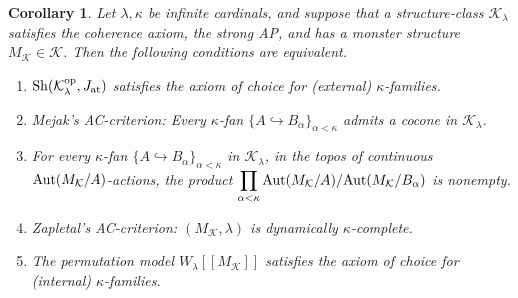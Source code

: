 \documentclass[10pt]{amsart}
\numberwithin{equation}{section}
\theoremstyle{plain}
\newtheorem{cor}[theorem]{Corollary}
\theoremstyle{definition}
\newcommand{\K}{\mathcal{K}}
\newcommand{\embed}{\hookrightarrow}
\begin{document}
\begin{cor}\label{cor:AC-criterion-main}
Let $\lambda,\kappa$ be infinite cardinals, and suppose that a structure-class $\K_\lambda$ satisfies the coherence axiom, the strong AP, and has a monster structure $M_\K\in\K$.
Then the following conditions are equivalent.
%
%
\begin{enumerate}
\item ${\rm Sh}(\K_\lambda^{\rm op},J_{\rm at})$ satisfies the axiom of choice for (external) $\kappa$-families.
\item Mejak's AC-criterion: Every $\kappa$-fan $\{A\embed B_\alpha\}_{\alpha<\kappa}$ admits a cocone in $\K_\lambda$. 
\item For every $\kappa$-fan $\{A\embed B_\alpha\}_{\alpha<\kappa}$ in $\K_\lambda$, in the topos of continuous ${\rm Aut}(M_\K/A)$-actions, the product 
$\displaystyle{\prod_{\alpha<\kappa}{\rm Aut}(M_\K/A)/{\rm Aut}(M_\K/B_\alpha)}$ is nonempty.
\item Zapletal's AC-criterion: $(M_\K,\lambda)$ is dynamically $\kappa$-complete.
\item The permutation model $W_\lambda[[M_\K]]$ satisfies the axiom of choice for (internal) $\kappa$-families.
\end{enumerate}


\end{cor}
\end{document}
